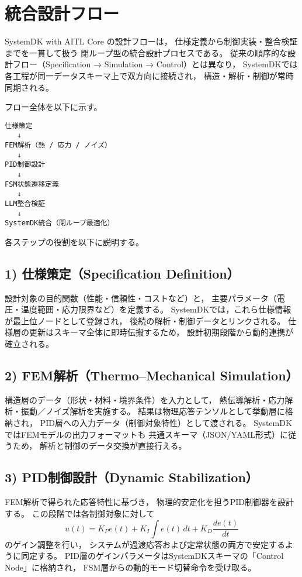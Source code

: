 \section{統合設計フロー}

SystemDK with AITL Core の設計フローは，
仕様定義から制御実装・整合検証までを一貫して扱う
閉ループ型の統合設計プロセスである。
従来の順序的な設計フロー（Specification → Simulation → Control）とは異なり，
SystemDKでは各工程が同一データスキーマ上で双方向に接続され，
構造・解析・制御が常時同期される。

\vspace{1em}
\noindent フロー全体を以下に示す。

\begin{verbatim}
仕様策定
   ↓
FEM解析（熱 / 応力 / ノイズ）
   ↓
PID制御設計
   ↓
FSM状態遷移定義
   ↓
LLM整合検証
   ↓
SystemDK統合（閉ループ最適化）
\end{verbatim}

各ステップの役割を以下に説明する。

\subsection{1) 仕様策定（Specification Definition）}
設計対象の目的関数（性能・信頼性・コストなど）と，
主要パラメータ（電圧・温度範囲・応力限界など）を定義する。
SystemDKでは，これら仕様情報が最上位ノードとして登録され，
後続の解析・制御データとリンクされる。
仕様層の更新はスキーマ全体に即時伝搬するため，
設計初期段階から動的連携が確立される。

\subsection{2) FEM解析（Thermo–Mechanical Simulation）}
構造層のデータ（形状・材料・境界条件）を入力として，
熱伝導解析・応力解析・振動／ノイズ解析を実施する。
結果は物理応答テンソルとして挙動層に格納され，
PID層への入力データ（制御対象特性）として渡される。
SystemDKではFEMモデルの出力フォーマットも
共通スキーマ（JSON/YAML形式）に従うため，
解析と制御のデータ交換が直接行える。

\subsection{3) PID制御設計（Dynamic Stabilization）}
FEM解析で得られた応答特性に基づき，
物理的安定化を担うPID制御器を設計する。
この段階では各制御対象に対して
\[
u(t) = K_P e(t) + K_I \int e(t)\,dt + K_D \frac{de(t)}{dt}
\]
のゲイン調整を行い，
システムが過渡応答および定常状態の両方で安定するように同定する。
PID層のゲインパラメータはSystemDKスキーマの「Control Node」に格納され，
FSM層からの動的モード切替命令を受け取る。

